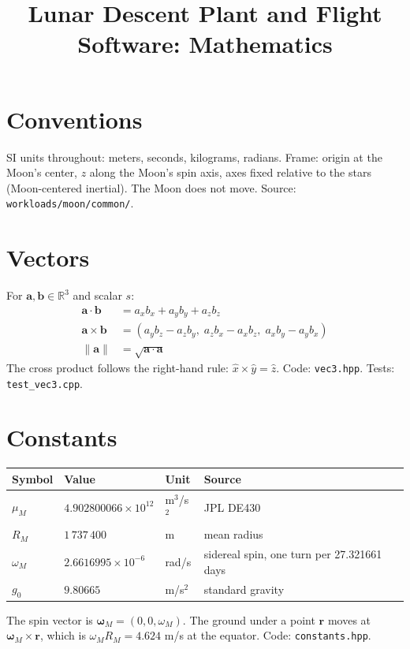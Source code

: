 \documentclass[11pt]{article}
\title{Lunar Descent Plant and Flight Software: Mathematics}
\author{}
\date{}
\begin{document}
\maketitle

\section{Conventions}
SI units throughout: meters, seconds, kilograms, radians.
Frame: origin at the Moon's center, $z$ along the Moon's spin axis, axes fixed relative
to the stars (Moon-centered inertial). The Moon does not move.
Source: \texttt{workloads/moon/common/}.

\section{Vectors}
For $\mathbf{a},\mathbf{b}\in\mathbb{R}^3$ and scalar $s$:
\begin{align}
\mathbf{a}\cdot\mathbf{b} &= a_x b_x + a_y b_y + a_z b_z \\
\mathbf{a}\times\mathbf{b} &= (a_y b_z - a_z b_y,\; a_z b_x - a_x b_z,\; a_x b_y - a_y b_x) \\
\lVert\mathbf{a}\rVert &= \sqrt{\mathbf{a}\cdot\mathbf{a}}
\end{align}
The cross product follows the right-hand rule: $\hat{x}\times\hat{y}=\hat{z}$.
Code: \texttt{vec3.hpp}. Tests: \texttt{test\_vec3.cpp}.

\section{Constants}
\begin{tabular}{llll}\toprule
Symbol & Value & Unit & Source\\\midrule
$\mu_M$ & $4.902800066\times10^{12}$ & m$^3$/s$^2$ & JPL DE430\\
$R_M$ & $1\,737\,400$ & m & mean radius\\
$\omega_M$ & $2.6616995\times10^{-6}$ & rad/s & sidereal spin, one turn per 27.321661 days\\
$g_0$ & $9.80665$ & m/s$^2$ & standard gravity\\\bottomrule
\end{tabular}

\noindent The spin vector is $\boldsymbol{\omega}_M = (0, 0, \omega_M)$. The ground under a
point $\mathbf{r}$ moves at $\boldsymbol{\omega}_M\times\mathbf{r}$, which is
$\omega_M R_M = 4.624$ m/s at the equator.
Code: \texttt{constants.hpp}.
\end{document}
